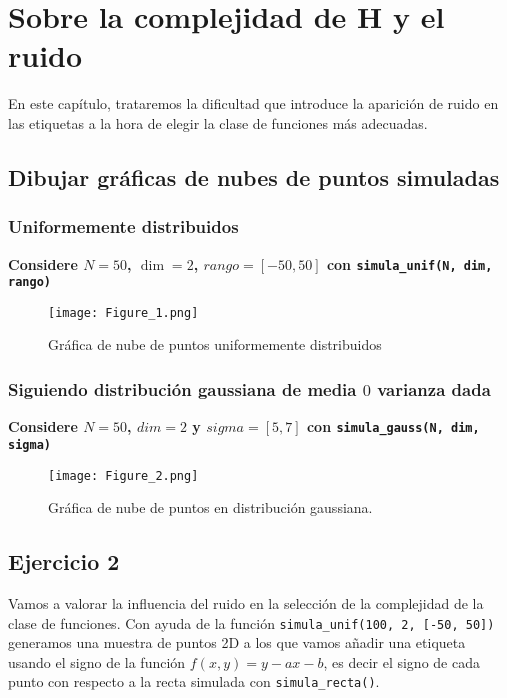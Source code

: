 \chapter{Sobre la complejidad de H y el ruido}

En este capítulo, trataremos la dificultad que introduce la aparición de
ruido en las etiquetas a la hora de elegir la clase de funciones más adecuadas.

\section{Dibujar gráficas de nubes de puntos simuladas}

\subsection{Uniformemente distribuidos}

\textbf{Considere $N = 50$, $\dim = 2$, $rango = [-50, 50]$ con
\texttt{simula_unif(N, dim, rango)}}

\begin{figure}[H]
\centering
\texttt{[image: Figure\_1.png]}
\caption{Gráfica de nube de puntos uniformemente distribuidos}
\end{figure}

\subsection{Siguiendo distribución gaussiana de media \texorpdfstring{$0$} y varianza dada}

\textbf{Considere $N = 50$, $dim = 2$ y $sigma = [5, 7]$ con 
\texttt{simula_gauss(N, dim, sigma)}}

\begin{figure}[H]
\centering
\texttt{[image: Figure\_2.png]}
\caption{Gráfica de nube de puntos en distribución gaussiana.}
\end{figure}

\section{Ejercicio 2}

Vamos a valorar la influencia del ruido en la selección de la complejidad de la
clase de funciones.  Con ayuda de la función
\texttt{simula_unif(100, 2, [-50, 50])} generamos una muestra de
puntos 2D a los que vamos añadir una etiqueta usando el signo de la función 
$f(x, y) = y - ax - b$, es decir el signo de cada punto con respecto a la
recta simulada con \texttt{simula_recta()}.  

